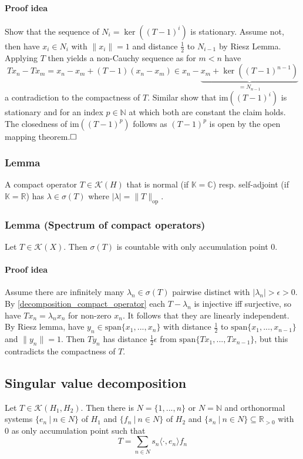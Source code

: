 \documentclass{scrartcl}
\newcommand{\R}{\mathbb{R}}
\newcommand{\N}{\mathbb{N}}
\newcommand{\C}{\mathbb{C}}
\begin{document}
\paragraph{Proof idea} Show that the sequence of $N_i = \ker((T - 1)^i)$ is stationary. Assume not, then have $x_i \in N_i$ with $\|x_i\| = 1$ and distance $\frac 1 2$ to $N_{i - 1}$ by Riesz Lemma. Applying $T$ then yields a non-Cauchy sequence as for $m < n$ have
\begin{equation*}
    Tx_n - Tx_m = x_n - x_m + (T - 1)(x_n - x_m) \in x_n - \underbrace{x_m + \ker((T - 1)^{n - 1})}_{= N_{n - 1}}
\end{equation*}
a contradiction to the compactness of $T$. Similar show that $\mathrm{im}((T - 1)^i)$ is stationary and for an index $p \in \N$ at which both are constant the claim holds. The closedness of $\mathrm{im}((T - 1)^p)$ follows as $(T - 1)^p$ is open by the open mapping theorem.$\hfill\square$

\subsubsection{Lemma}
A compact operator $T \in \mathcal{K}(H)$ that is normal (if $\mathbb{K} = \C$) resp. self-adjoint (if $\mathbb{K} = \R$) has $\lambda \in \sigma(T)$ where $|\lambda| = \| T \|_{\mathrm{op}}$.

\subsubsection{Lemma (Spectrum of compact operators)}
Let $T \in \mathcal{K}(X)$. Then $\sigma(T)$ is countable with only accumulation point $0$.
\paragraph{Proof idea} Assume there are infinitely many $\lambda_n \in \sigma(T)$ pairwise distinct with $|\lambda_n| > \epsilon > 0$. By \ref{decomposition_compact_operator} each $T - \lambda_n$ is injective iff surjective, so have $Tx_n = \lambda_n x_n$ for non-zero $x_n$. 
It follows that they are linearly independent. By Riesz lemma, have $y_n \in \mathrm{span}\{x_1, ..., x_n\}$ with distance $\frac 1 2$ to $\mathrm{span}\{x_1, ..., x_{n - 1}\}$ and $\| y_n \| = 1$. Then $Ty_n$ has distance $\frac 1 2 \epsilon$ from $\mathrm{span}\{Tx_1, ..., Tx_{n-1}\}$, but this contradicts the compactness of $T$.

\subsection{Singular value decomposition}
Let $T \in \mathcal{K}(H_1, H_2)$. Then there is $N = \{ 1, ..., n \}$ or $N = \N$ and orthonormal systems $\{ e_n \ | \ n \in N \}$ of $H_1$ and $\{ f_n \ | \ n \in N \}$ of $H_2$ and $\{ s_n \ | \ n \in N \} \subseteq \R_{>0}$ with $0$ as only accumulation point such that
\begin{equation*}
    T = \sum_{n \in N} s_n \langle \cdot, e_n \rangle f_n
\end{equation*}
\end{document}
